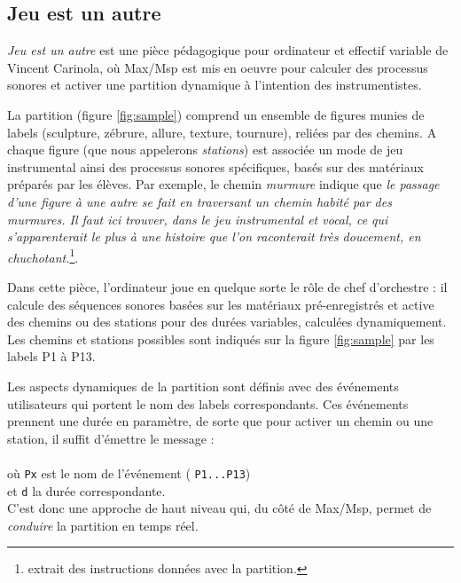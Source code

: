 \documentclass{article}
\newcommand{\OSC}[1]	{{\fontsize{9pt}{9pt} \selectfont\texttt{#1}}}
\newcommand{\tab}{\hspace*{4mm}}
\begin{document}
\subsection{Jeu est un autre}

\emph{Jeu est un autre} est une pièce pédagogique pour ordinateur et effectif variable de Vincent Carinola, où Max/Msp est mis en oeuvre pour calculer des processus sonores et activer une partition dynamique à l'intention des instrumentistes. 

La partition (figure \ref{fig:sample}) comprend un ensemble de figures munies de labels (sculpture, zébrure, allure, texture, tournure), reliées par des chemins. A chaque figure (que nous appelerons \emph{stations}) est associée un mode de jeu instrumental ainsi des processus sonores spécifiques, basés sur des matériaux préparés par les élèves. Par exemple, le chemin \emph{murmure} indique que \emph{le passage d'une figure à une autre se fait en traversant un chemin habité par des murmures. Il faut ici trouver, dans le jeu instrumental et vocal, ce qui s'apparenterait le plus à une histoire que l'on raconterait très doucement, en chuchotant.}\footnote{extrait des instructions données avec la partition.}.


Dans cette pièce, l'ordinateur joue en quelque sorte le rôle de chef d'orchestre : il calcule des séquences sonores basées sur les matériaux pré-enregistrés et active des chemins ou des stations pour des durées variables, calculées dynamiquement. Les chemins et stations possibles sont indiqués sur la figure \ref{fig:sample} par les labels P1 à P13. 

Les aspects dynamiques de la partition sont définis avec des événements utilisateurs qui portent le nom des labels correspondants. Ces événements prennent une durée en paramètre, de sorte que pour activer un chemin ou une station, il suffit d'émettre le message :\\
\tab \tab \OSC{/ITL/scene Px d} \\
où \OSC{Px} est le nom de l'événement (\OSC{P1...P13})\\
 et \OSC{d} la durée correspondante. \\
C'est donc une approche de haut niveau qui, du côté de Max/Msp, permet de \emph{conduire} la partition en temps réel.
\end{document}
